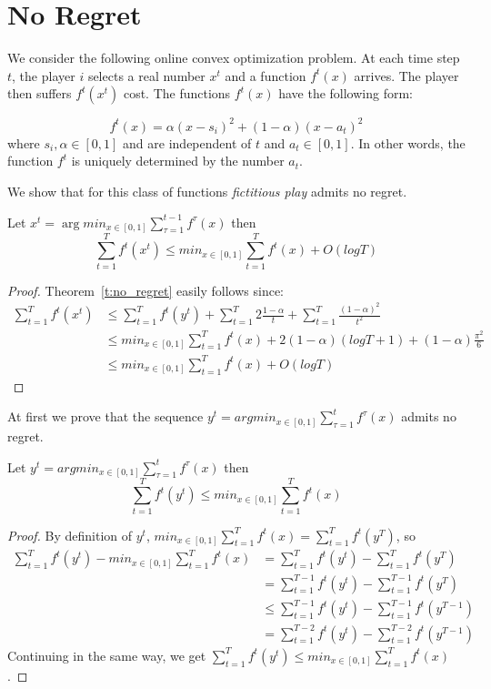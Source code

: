 \section{No Regret}
We consider the following online convex optimization problem.
At each time step $t$, the player $i$ selects a real number $x^t$ and a
function $f^t(x)$ arrives. The player then suffers $f^t(x^t)$ cost.
The functions $f^t(x)$ have the following form:

$$f^t(x) = \alpha(x-s_i)^2 + (1-\alpha)(x-a_t)^2$$
where $s_i,\alpha \in [0,1]$ and are independent of $t$ and $a_t \in [0,1]$.
In other words, the function $f^t$ is uniquely determined by the number $a_t$.

We show that for this class of functions \emph{fictitious play} admits no regret.
\begin{theorem}\label{t:no_regret}
  Let $x^t = \arg min_{x \in [0,1]} \sum_{\tau = 1}^{t-1} f^\tau (x)$ then
  $$
  \sum_{t = 1}^{T} f^t(x^t) \leq min_{x \in [0,1]} \sum_{t=1}^T f^t(x) + O(log T)
  $$
\end{theorem}
\begin{proof}

Theorem~\ref{t:no_regret} easily follows since:
\begin{align*}
  \sum_{t=1}^T f^t(x^t)
  &\leq
  \sum_{t=1}^T f^t(y^t) + \sum_{t=1}^T 2\frac{1-\alpha}{t} +
  \sum_{t=1}^T \frac{(1-\alpha)^2}{t^2}\\
  &\leq
  min_{x \in [0,1]} \sum_{t=1}^T f^t(x) +
  2(1-\alpha)(logT + 1) + (1-\alpha)\frac{\pi^2}{6}\\
  &\leq
  min_{x \in [0,1]} \sum_{t=1}^T f^t(x) + O(logT)
\end{align*}
\end{proof}

At first we prove that the sequence
$y^t = arg min_{x \in [0,1]} \sum_{\tau = 1}^{t}f^\tau (x)$ admits no regret.
\begin{lemma} Let $y^t = argmin_{x \in [0,1]} \sum_{\tau = 1}^t f^\tau (x)$ then
  $$ \sum_{t=1}^T f^t(y^t) \leq min_{x \in [0,1]} \sum_{t=1}^T f^t(x)$$
\end{lemma}
\begin{proof}By definition of $y^t$,
  $min_{x \in [0,1]} \sum_{t=1}^T f^t(x) = \sum_{t=1}^T f^t(y^T)$, so
  \begin{align*}
    \sum_{t=1}^T f^t(y^t) - min_{x \in [0,1]} \sum_{t=1}^T f^t(x) &=
    \sum_{t=1}^T f^t(y^t) - \sum_{t=1}^T f^t(y^T)\\
    &= \sum_{t=1}^{T-1} f^t(y^t) - \sum_{t=1}^{T-1} f^t(y^T)\\
    &\leq \sum_{t=1}^{T-1} f^t(y^t) - \sum_{t=1}^{T-1} f^t(y^{T-1})\\
    &= \sum_{t=1}^{T-2} f^t(y^t) - \sum_{t=1}^{T-2} f^t(y^{T-1})
  \end{align*}
  Continuing in the same way, we get
  $\sum_{t=1}^T f^t(y^t) \leq min_{x \in [0,1]} \sum_{t=1}^T f^t(x)$.
\end{proof}

